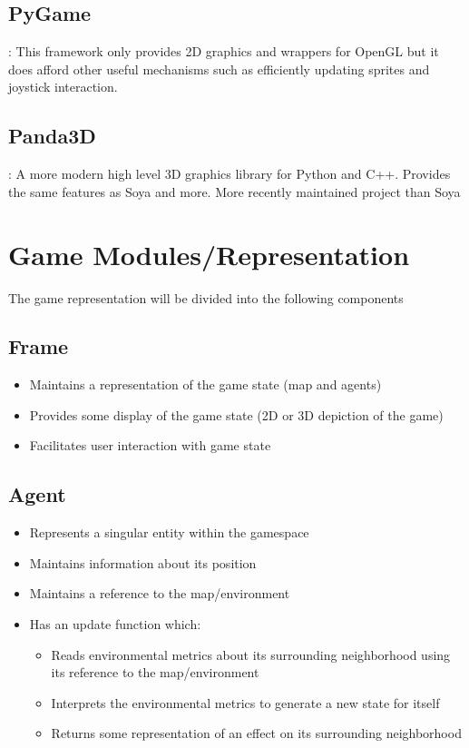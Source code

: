 \documentclass{article}
\begin{document}
\subsection{PyGame}: This framework only provides 2D graphics and wrappers for OpenGL but it does afford other useful mechanisms such as efficiently updating sprites and joystick interaction.
\subsection{Panda3D}: A more modern high level 3D graphics library for Python and C++.  Provides the same features as Soya and more.  More recently maintained project than Soya\\

\section{Game Modules/Representation}
The game representation will be divided into the following components

\subsection{Frame}
	\begin{itemize}
		\item Maintains a representation of the game state (map and agents)
		\item Provides some display of the game state (2D or 3D depiction of the game)
		\item Facilitates user interaction with game state

	\end{itemize}

\subsection{Agent}
	\begin{itemize}
		\item Represents a singular entity within the gamespace
		\item Maintains information about its position
		\item Maintains a reference to the map/environment
		\item Has an update function which:
			\begin{itemize}	
				\item Reads environmental metrics about its surrounding neighborhood using its reference to the map/environment
				\item Interprets the environmental metrics to generate a new state for itself
				\item Returns some representation of an effect on its surrounding neighborhood
			\end{itemize}
	\end{itemize}
\end{document}
